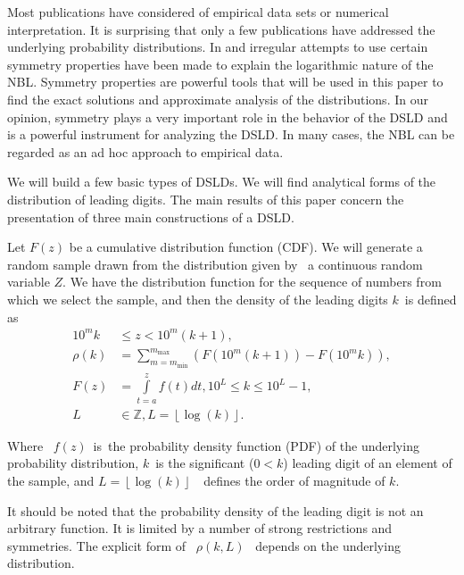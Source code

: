 \documentclass[titlepage,fleqn]{article}%
\providecommand{\U}[1]{\protect\rule{.1in}{.1in}}
\begin{document}
Most publications have considered of empirical data sets or numerical
interpretation. It is surprising that only a few publications have addressed
the underlying probability distributions. In
\cite{pinkham} and \cite{raimi}
irregular attempts to use certain symmetry properties have been made to
explain the logarithmic nature of the NBL. Symmetry properties are powerful
tools that will be used in this paper to find the exact solutions and
approximate analysis of the distributions. In our opinion, symmetry plays a
very important role in the behavior of the DSLD and is a powerful instrument
for analyzing the DSLD. In many cases, the NBL can be regarded as an ad hoc
approach to empirical data.

We will build a few basic types of DSLDs. We will find analytical forms of the
distribution of leading digits. The main results of this paper concern the
presentation of three main constructions of a DSLD.

Let $F(z)$ be a cumulative distribution function (CDF). We will generate a
random sample drawn from the distribution given by \ a continuous random
variable $Z$. We have the distribution function for the sequence of numbers
from which we select the sample, and then the density of the leading digits
$k$\ is defined as\bigskip%
\begin{align}
10^{m}k &  \leq z<10^{m}(k+1),\label{MainFormulation}\\
\rho(k) &  =%
{\displaystyle\sum\limits_{m=m_{\min}}^{m_{\max}}}
\left(  F(10^{m}(k+1))-F(10^{m}k)\right)  ,\\
F(z) &  =%
{\displaystyle\int\limits_{t=a}^{z}}
f(t)dt,10^{L}\leq k\leq10^{L}-1,\nonumber\\
L &  \in%
\mathbb{Z}
,L=\left\lfloor \log(k)\right\rfloor .\nonumber
\end{align}


Where \ $f(z)$\ is\ the probability density function (PDF) of the underlying
probability distribution, $k$\ is the significant ($0<k$) leading digit of an
element of the sample, and $L=\left\lfloor \log(k)\right\rfloor $\ \ defines
the order of magnitude of $k$.

It should be noted that the probability density of the leading digit is not an
arbitrary function. It is limited by a number of strong restrictions and
symmetries. The explicit form of \ $\rho(k,L)$ \ depends on the underlying distribution.
\end{document}
